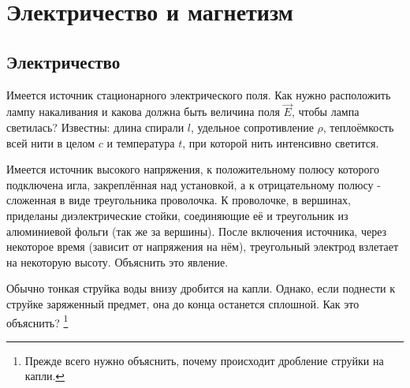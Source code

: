 \chapter{Электричество и магнетизм}
\thispagestyle{empty}
\clearpage
\section{Электричество}
\begin{problem}
Имеется источник стационарного электрического поля. Как нужно расположить лампу накаливания и какова должна быть величина поля $\vec{E}$, чтобы лампа светилась? Известны: длина спирали $l$, удельное сопротивление $\rho$, теплоёмкость всей нити в целом $c$ и температура $t$, при которой нить интенсивно светится.
\end{problem}
\begin{problem}
Имеется источник высокого напряжения, к положительному полюсу которого подключена игла, закреплённая над установкой, а к отрицательному полюсу - сложенная в виде треугольника проволочка. К проволочке, в вершинах, приделаны диэлектрические стойки, соединяющие её и треугольник из алюминиевой фольги (так же за вершины). После включения источника, через некоторое время (зависит от напряжения на нём), треугольный электрод взлетает на некоторую высоту. Объяснить это явление.
\end{problem}
\begin{problem}
Обычно тонкая струйка воды внизу дробится на капли. Однако, если поднести к струйке заряженный предмет, она до конца останется сплошной. Как это объяснить?
\footnote{Прежде всего нужно объяснить, почему происходит дробление струйки на капли.}
\end{problem}